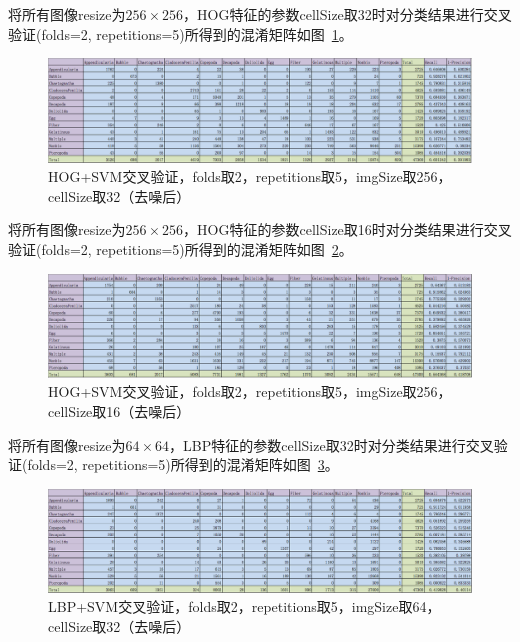 \documentclass[12pt]{article}
\begin{document}
将所有图像resize为$256 \times 256$，HOG特征的参数cellSize取32时对分类结果进行交叉验证(folds=2, repetitions=5)所得到的混淆矩阵如图~\ref{fig:HOG-SVM-2-folds-5-repetitions-32-256-noNoise}。
\begin{figure}[!ht]
\centering
\includegraphics[width=1.0\linewidth]{HOG-SVM-2-folds-5-repetitions-32-256-noNoise}
\caption{HOG+SVM交叉验证，folds取2，repetitions取5，imgSize取256，cellSize取32（去噪后）}
\label{fig:HOG-SVM-2-folds-5-repetitions-32-256-noNoise}
\end{figure}

将所有图像resize为$256 \times 256$，HOG特征的参数cellSize取16时对分类结果进行交叉验证(folds=2, repetitions=5)所得到的混淆矩阵如图~\ref{fig:HOG-SVM-2-folds-5-repetitions-16-256-noNoise}。
\begin{figure}[!ht]
\centering
\includegraphics[width=1.0\linewidth]{HOG-SVM-2-folds-5-repetitions-16-256-noNoise}
\caption{HOG+SVM交叉验证，folds取2，repetitions取5，imgSize取256，cellSize取16（去噪后）}
\label{fig:HOG-SVM-2-folds-5-repetitions-16-256-noNoise}
\end{figure}


将所有图像resize为$64 \times 64$，LBP特征的参数cellSize取32时对分类结果进行交叉验证(folds=2, repetitions=5)所得到的混淆矩阵如图~\ref{fig:LBP-SVM-2-folds-5-repetitions-32-64-noNoise}。
\begin{figure}[!ht]
\centering
\includegraphics[width=1.0\linewidth]{LBP-SVM-2-folds-5-repetitions-32-64-noNoise}
\caption{LBP+SVM交叉验证，folds取2，repetitions取5，imgSize取64，cellSize取32（去噪后）}
\label{fig:LBP-SVM-2-folds-5-repetitions-32-64-noNoise}
\end{figure}
\end{document}
